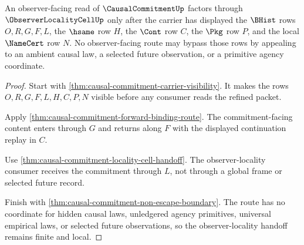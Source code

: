 \begin{theorem}
\label{thm:causal-commitment-observer-locality-handoff}
An observer-facing read of $\CausalCommitmentUp$ factors through $\ObserverLocalityCellUp$ only after the carrier has displayed the $\BHist$ rows $O,R,G,F,L$, the $\hsame$ row $H$, the $\Cont$ row $C$, the $\Pkg$ row $P$, and the local $\NameCert$ row $N$. No observer-facing route may bypass those rows by appealing to an ambient causal law, a selected future observation, or a primitive agency coordinate.
\end{theorem}
\begin{proof}
Start with \autoref{thm:causal-commitment-carrier-visibility}. It makes the rows $O,R,G,F,L,H,C,P,N$ visible before any consumer reads the refined packet.

Apply \autoref{thm:causal-commitment-forward-binding-route}. The commitment-facing content enters through $G$ and returns along $F$ with the displayed continuation replay in $C$.

Use \autoref{thm:causal-commitment-locality-cell-handoff}. The observer-locality consumer receives the commitment through $L$, not through a global frame or selected future record.

Finish with \autoref{thm:causal-commitment-non-escape-boundary}. The route has no coordinate for hidden causal laws, unledgered agency primitives, universal empirical laws, or selected future observations, so the observer-locality handoff remains finite and local.
\end{proof}


